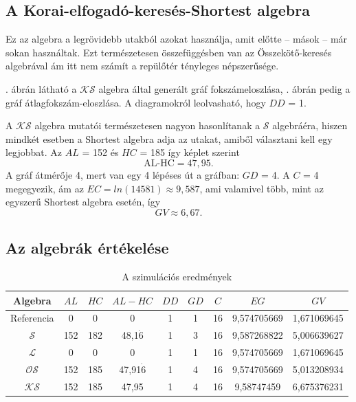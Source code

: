   \subsection{A Korai-elfogadó-keresés-Shortest algebra}
  Ez az algebra a legrövidebb utakból azokat használja, amit előtte -- mások -- már sokan használtak. Ezt természetesen összefüggésben van az Összekötő-keresés algebrával ám itt nem számít a repülőtér tényleges népszerűsége.

  . ábrán látható a $\mathcal{KS}$ algebra által generált gráf fokszámeloszlása, . ábrán pedig a gráf átlagfokszám-eloszlása. A diagramokról leolvasható, hogy $DD$ = 1.

  A $\mathcal{KS}$ algebra mutatói természetesen nagyon hasonlítanak a $\mathcal{S}$ algebráéra, hiszen mindkét esetben a Shortest algebra adja az utakat, amiből választani kell egy legjobbat. Az $AL$ = 152 és $HC$ = 185 így  képlet szerint $$\text{AL-HC} = 47,95.$$
  A gráf átmérője 4, mert van egy 4 lépéses út a gráfban: $GD$ = 4. A $C$ = 4 megegyezik, ám az $EC=ln(14581) \approx 9,587$, ami valamivel több, mint az egyszerű Shortest algebra esetén, így $$GV \approx 6,67.$$
  \newpage

  \subsection{Az algebrák értékelése}
  \renewcommand{\arraystretch}{1.2}
  \begin{table}[ht]
    \centering
      \begin{tabular}{| c || c | c || c || c | c | c | c || c |}
      \hline
      \textbf{Algebra} & $AL$ & $HC$ & $AL-HC$ & $DD$ & $GD$ & $C$ & $EG$ & $GV$\\
      \hline
      Referencia & 0 & 0 & 0 & 1 & 1 & 16 & 9,574705669 & 1,671069645\\
      $\mathcal{S}$ & 152 & 182 & 48,1$\dot{6}$ & 1 & 3 & 16 & 9,587268822 & 5,006639627\\
      $\mathcal{L}$ & 0 & 0 & 0 & 1 & 1 & 16 & 9,574705669 & 1,671069645 \\
      $\mathcal{OS}$ & 152 & 185 & 47,91$\dot{6}$ & 1 & 4 & 16 & 9,574705669 & 5,013208934\\
      $\mathcal{KS}$ & 152 & 185 & 47,95 & 1 & 4 & 16 & 9,58747459 & 6,675376231\\
      \hline
      \end{tabular}
    \caption{A szimulációs eredmények}
    \label{tab:eredmenyek}
  \end{table}

